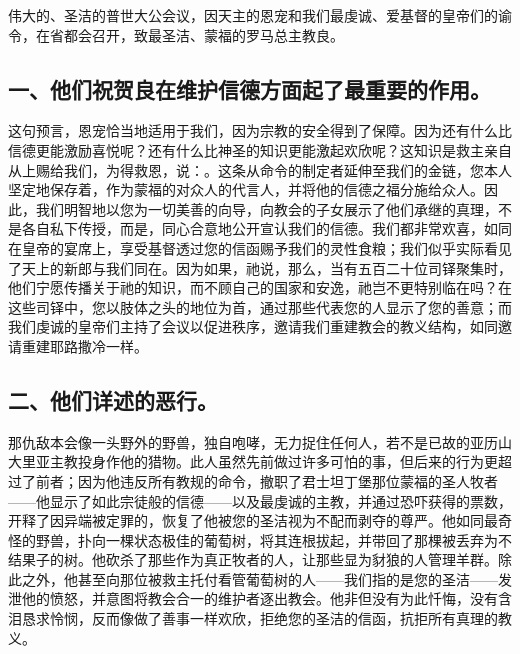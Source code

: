 伟大的、圣洁的普世大公会议，因天主的恩宠和我们最虔诚、爱基督的皇帝们的谕令，在省都会召开，致最圣洁、蒙福的罗马总主教良。\par


\subsection{一、他们祝贺良在维护信德方面起了最重要的作用。}

这句预言，恩宠恰当地适用于我们，因为宗教的安全得到了保障。因为还有什么比信德更能激励喜悦呢？还有什么比神圣的知识更能激起欢欣呢？这知识是救主亲自从上赐给我们，为得救恩，说：。这条从命令的制定者延伸至我们的金链，您本人坚定地保存着，作为蒙福的对众人的代言人，并将他的信德之福分施给众人。因此，我们明智地以您为一切美善的向导，向教会的子女展示了他们承继的真理，不是各自私下传授，而是，同心合意地公开宣认我们的信德。我们都非常欢喜，如同在皇帝的宴席上，享受基督透过您的信函赐予我们的灵性食粮；我们似乎实际看见了天上的新郎与我们同在。因为如果，祂说，那么，当有五百二十位司铎聚集时，他们宁愿传播关于祂的知识，而不顾自己的国家和安逸，祂岂不更特别临在吗？在这些司铎中，您以肢体之头的地位为首，通过那些代表您的人显示了您的善意；而我们虔诚的皇帝们主持了会议以促进秩序，邀请我们重建教会的教义结构，如同邀请重建耶路撒冷一样。\par


\subsection{二、他们详述的恶行。}

那仇敌本会像一头野外的野兽，独自咆哮，无力捉住任何人，若不是已故的亚历山大里亚主教投身作他的猎物。此人虽然先前做过许多可怕的事，但后来的行为更超过了前者；因为他违反所有教规的命令，撤职了君士坦丁堡那位蒙福的圣人牧者——他显示了如此宗徒般的信德——以及最虔诚的主教，并通过恐吓获得的票数，开释了因异端被定罪的，恢复了他被您的圣洁视为不配而剥夺的尊严。他如同最奇怪的野兽，扑向一棵状态极佳的葡萄树，将其连根拔起，并带回了那棵被丢弃为不结果子的树。他砍杀了那些作为真正牧者的人，让那些显为豺狼的人管理羊群。除此之外，他甚至向那位被救主托付看管葡萄树的人——我们指的是您的圣洁——发泄他的愤怒，并意图将教会合一的维护者逐出教会。他非但没有为此忏悔，没有含泪恳求怜悯，反而像做了善事一样欢欣，拒绝您的圣洁的信函，抗拒所有真理的教义。\par

